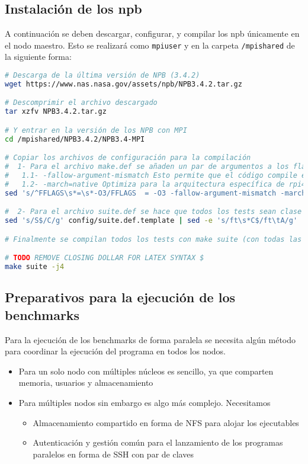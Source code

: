 \subsection{Instalación de los \acrshort{npb}}
A continuación se deben descargar, configurar, y compilar los \acrlong{npb} únicamente en el nodo maestro. Esto se realizará como \texttt{mpiuser} y en la carpeta \texttt{/mpishared} de la siguiente forma:

\begin{lstlisting}[language=bash]
# Descarga de la última versión de NPB (3.4.2)
wget https://www.nas.nasa.gov/assets/npb/NPB3.4.2.tar.gz

# Descomprimir el archivo descargado
tar xzfv NPB3.4.2.tar.gz

# Y entrar en la versión de los NPB con MPI
cd /mpishared/NPB3.4.2/NPB3.4-MPI

# Copiar los archivos de configuración para la compilación
#  1- Para el archivo make.def se añaden un par de argumentos a los flags de compilación:
#   1.1- -fallow-argument-mismatch Esto permite que el código compile en las últimas versiones de gfortran
#   1.2- -march=native Optimiza para la arquitectura específica de rpi4
sed 's/^FFLAGS\s*=\s*-O3/FFLAGS  = -O3 -fallow-argument-mismatch -march=native/g' config/make.def.template | sed -e 's/^CFLAGS\s*=\s*-O3/CFLAGS  = -O3 -march=native/g' > config/make.def

#  2- Para el archivo suite.def se hace que todos los tests sean clase C menos FT, que por razones de memoria es clase A, y MG clase B, por los mismos motivos.
sed 's/S$/C/g' config/suite.def.template | sed -e 's/ft\s*C$/ft\tA/g' | sed -e 's/mg\s*C$/mg\tB/g' > config/suite.def

# Finalmente se compilan todos los tests con make suite (con todas las CPU en paralelo)

# TODO REMOVE CLOSING DOLLAR FOR LATEX SYNTAX $
make suite -j4
\end{lstlisting}

\subsection{Preparativos para la ejecución de los benchmarks}
Para la ejecución de los benchmarks de forma paralela se necesita algún método para coordinar la ejecución del programa en todos los nodos.

\begin{itemize}
    \item Para un solo nodo con múltiples núcleos es sencillo, ya que comparten memoria, usuarios y almacenamiento
    \item Para múltiples nodos sin embargo es algo más complejo. Necesitamos
    \begin{itemize}
        \item Almacenamiento compartido en forma de NFS para alojar los ejecutables
        \item Autenticación y gestión común para el lanzamiento de los programas paralelos en forma de SSH con par de claves
    \end{itemize}
\end{itemize}

